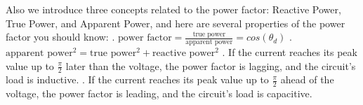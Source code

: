 Also we introduce three concepts related to the power factor: Reactive Power, True Power, and Apparent Power, and here are several properties of the power factor you should know:
. $\text{power factor}=\frac{\text{true power}}{\text{apparent power}}=cos({\theta}_d)$
. $\text{apparent power}^2=\text{true power}^2+\text{reactive power}^2$
. If the current reaches its peak value up to $\frac{\pi}{2}$ later than the voltage, the power factor is lagging, and the circuit's load is inductive.
. If the current reaches its peak value up to $\frac{\pi}{2}$ ahead of the voltage, the power factor is leading, and the circuit's load is capacitive.
